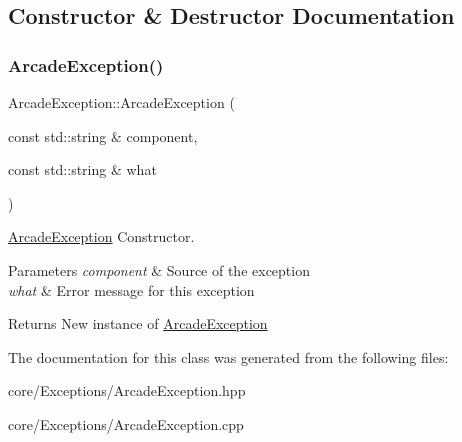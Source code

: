 \subsection{Constructor \& Destructor Documentation}
\mbox{\label{class_arcade_exception_ad7e357368a060f8becc46f68db639951}} 
\subsubsection{\texorpdfstring{Arcade\+Exception()}{ArcadeException()}}
{\footnotesize\ttfamily Arcade\+Exception\+::\+Arcade\+Exception (\begin{DoxyParamCaption}\item[{const std\+::string \&}]{component,  }\item[{const std\+::string \&}]{what }\end{DoxyParamCaption})}



\hyperlink{class_arcade_exception}{Arcade\+Exception} Constructor. 


\begin{DoxyParams}{Parameters}
{\em component} & Source of the exception \\
\hline
{\em what} & Error message for this exception\\
\hline
\end{DoxyParams}
\begin{DoxyReturn}{Returns}
New instance of \hyperlink{class_arcade_exception}{Arcade\+Exception} 
\end{DoxyReturn}


The documentation for this class was generated from the following files\+:\begin{DoxyCompactItemize}
\item 
core/\+Exceptions/Arcade\+Exception.\+hpp\item 
core/\+Exceptions/Arcade\+Exception.\+cpp\end{DoxyCompactItemize}
